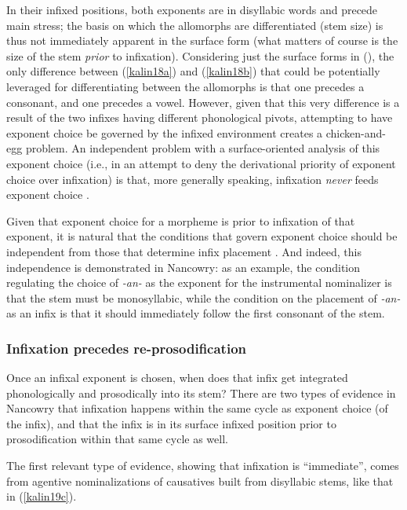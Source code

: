 \documentclass[output=paper]{langscibook}
\newcounter{lasttmp}    %
\newcommand{\Last}{\setcounter{lasttmp}{\value{equation}}(\thelasttmp)\xspace}
\begin{document}
\noindent In their infixed positions, both exponents are in disyllabic words and precede main stress; the basis on which the allomorphs are differentiated (stem size) is thus not immediately apparent in the surface form (what matters of course is the size of the stem \textit{prior} to infixation). Considering just the surface forms in \Last, the only difference between (\ref{kalin18a}) and (\ref{kalin18b}) that could be potentially leveraged for differentiating between the allomorphs is that one precedes a consonant, and one precedes a vowel. However, given that this very difference is a result of the two infixes having different phonological pivots, attempting to have exponent choice be governed by the infixed environment creates a chicken-and-egg problem. An independent problem with a surface-oriented analysis of this exponent choice (i.e., in an attempt to deny the derivational priority of exponent choice over infixation) is that, more  generally speaking, infixation {\it never} feeds exponent choice \citep{KalinIP}.  

Given that exponent choice for a morpheme is prior to infixation of that exponent, it is natural that the conditions that govern exponent choice should be independent from those that determine infix placement  \citep{KalinRolle21}. And indeed, this independence is demonstrated in Nancowry: as an example, the condition regulating the choice of \textit{-an-} as the exponent for the instrumental nominalizer is that the stem must be monosyllabic, while the condition on the placement of \textit{-an-} as an infix is that it should immediately follow the first consonant of the stem.

\subsubsection{Infixation precedes re-prosodification}\label{kalininford}\label{sec:kalin:4.2.2}

Once an infixal exponent is chosen, when does that infix get integrated phonologically and prosodically into its stem? There are two types of evidence in Nancowry that infixation happens within the same cycle as exponent choice (of the infix), and that the infix is in its surface infixed position prior to prosodification within that same cycle as well. 

The first relevant type of evidence, showing that infixation is ``immediate'', comes from agentive nominalizations of causatives built from disyllabic stems, like that in (\ref{kalin19c}).
\end{document}
